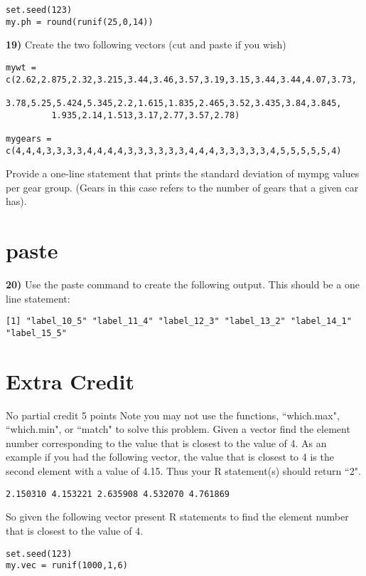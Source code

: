 \documentclass{article}
\begin{document}
\begin{verbatim}
set.seed(123)
my.ph = round(runif(25,0,14))
\end{verbatim}

\noindent
{\bf 19)} Create the two following vectors (cut and paste if you wish)
\begin{verbatim}
mywt = c(2.62,2.875,2.32,3.215,3.44,3.46,3.57,3.19,3.15,3.44,3.44,4.07,3.73, 
         3.78,5.25,5.424,5.345,2.2,1.615,1.835,2.465,3.52,3.435,3.84,3.845, 
         1.935,2.14,1.513,3.17,2.77,3.57,2.78)

mygears = c(4,4,4,3,3,3,3,4,4,4,4,3,3,3,3,3,3,4,4,4,3,3,3,3,3,4,5,5,5,5,5,4)
\end{verbatim}
\noindent
Provide a one-line statement that prints the standard deviation of mympg values per gear group. (Gears in this case refers to the number of gears that a given car has).

\section*{paste}
\noindent
{\bf 20)} Use the paste command to create the following output. This should be a one line
statement:
\begin{verbatim}
[1] "label_10_5" "label_11_4" "label_12_3" "label_13_2" "label_14_1" "label_15_5"
\end{verbatim}


\section*{Extra Credit} No partial credit 5 points
Note you may not use the functions, ``which.max", ``which.min", or ``match" to solve this problem. Given a vector find the element number corresponding to the value that is closest to
the value of 4. As an example if you had the following vector, the value that is closest to
4 is the second element with a value of 4.15. Thus your R statement(s) should return ``2".

\begin{verbatim}
2.150310 4.153221 2.635908 4.532070 4.761869
\end{verbatim}

So given the following vector present R statements to find the element number that is
closest to the value of 4.

\begin{verbatim}
set.seed(123)
my.vec = runif(1000,1,6)
\end{verbatim}
\end{document}
